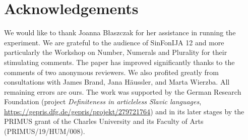 \documentclass[output=paper]{langscibook}
\begin{document}
\section*{Acknowledgements}
We would like to thank Joanna Błaszczak for her assistance in running the experiment. We are grateful to the audience of SinFonIJA 12 and more particularly the Workshop on Number, Numerals and Plurality for their stimulating comments. The paper has improved significantly thanks to the comments of two anonymous reviewers. We also profited greatly from consultations with James Brand, Jana Häussler, and Marta Wierzba. All remaining errors are ours. The work was supported by the German Research Foundation (project \textit{Definiteness in articleless Slavic languages}, \url{https://gepris.dfg.de/gepris/projekt/279721764}) and in its later stages by the PRIMUS grant of the Charles University and its Faculty of Arts (PRIMUS/19/HUM/008).

{\sloppy\printbibliography[heading=subbibliography,notkeyword=this]}
\end{document}
